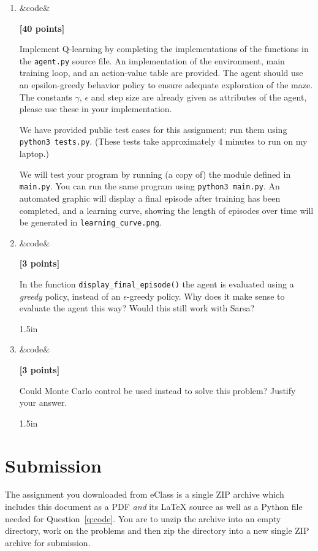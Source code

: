 \documentclass{article}
\newcounter{totalpoints}
\newcommand{\points}[2][]{{\addtocounter{totalpoints}{#2}\ifx&#1&\else\addtocounter{#1}{#2}\fi\textbf{[#2 points]}}}
\begin{document}
\begin{enumerate}
\begin{enumerate}
\item \points[code]{40}
Implement Q-learning by completing the implementations of the functions in the \verb|agent.py| source file.  An implementation of the environment, main training loop, and an action-value table are provided.
The agent should use an epsilon-greedy behavior policy to ensure adequate exploration of the maze. The constants $\gamma$, $\epsilon$ and step size are already given as attributes of the agent, please use these in your implementation.

We have provided public test cases for this assignment; run them using \verb|python3 tests.py|.
(These tests take approximately 4 minutes to run on my laptop.)

We will test your program by running (a copy of) the module defined in \verb|main.py|.  You can run the same program using \verb|python3 main.py|.  An automated graphic will display a final episode after training has been completed, and a learning curve, showing the length of episodes over time will be generated in \verb|learning_curve.png|.

\clearpage
\item \points[code]{3}
In the function \verb|display_final_episode()| the agent is evaluated using a \textit{greedy} policy, instead of an $\epsilon$-greedy policy.  Why does it make sense to evaluate the agent this way? Would this still work with Sarsa?
\begin{answer}{1.5in}
\end{answer}

\item \points[code]{3}
Could Monte Carlo control be used instead to solve this problem? Justify your answer.
\begin{answer}{1.5in}
\end{answer}
\end{enumerate}

\end{enumerate}


\clearpage

\section*{Submission}
The assignment you downloaded from eClass is a single ZIP archive which includes this document as a PDF {\em and} its \LaTeX{} source as well as a Python file needed for Question~\ref{q:code}.
You are to unzip the archive into an empty directory, work on the problems and then zip the directory into a new single ZIP archive for submission.
\end{document}
